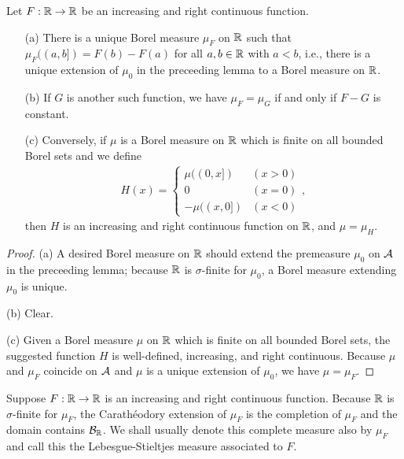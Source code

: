 \begin{thm}
    Let $F: {\mathbb{R}}\rightarrow{\mathbb{R}}$ be an increasing and right continuous function.
    \begin{enumerate}
        \item[(a)]
        {
            There is a unique Borel measure $\mu_F$ on ${\mathbb{R}}$ such that $\mu_F((a, b])=F(b)-F(a)$ for all $a, b\in{\mathbb{R}}$ with $a<b$, i.e., there is a unique extension of $\mu_0$ in the preceeding lemma to a Borel measure on ${\mathbb{R}}$.
        }
        \item[(b)]
        {
            If $G$ is another such function, we have $\mu_F=\mu_G$ if and only if $F-G$ is constant.
        }
        \item[(c)]
        {
            Conversely, if $\mu$ is a Borel measure on ${\mathbb{R}}$ which is finite on all bounded Borel sets and we define
            \begin{eqnarray*}
                H(x)=\left\{\begin{matrix}
                    \mu((0, x])     &   (x>0)\\
                        0           &   (x=0)\\
                    -\mu((x, 0])    &   (x<0)
                \end{matrix}\right.,
            \end{eqnarray*}
            then $H$ is an increasing and right continuous function on ${\mathbb{R}}$, and $\mu=\mu_H$.
        }
    \end{enumerate}
\end{thm}
\begin{proof}
    \hangindent=0.65cm
    \noindent(a)
    A desired Borel measure on ${\mathbb{R}}$ should extend the premeasure $\mu_0$ on ${\mathcal{A}}$ in the preceeding lemma; because ${\mathbb{R}}$ is $\sigma$-finite for $\mu_0$, a Borel measure extending $\mu_0$ is unique.

    \noindent(b)
    Clear.
    
    \noindent(c)
    Given a Borel measure $\mu$ on ${\mathbb{R}}$ which is finite on all bounded Borel sets, the suggested function $H$ is well-defined, increasing, and right continuous.
    Because $\mu$ and $\mu_F$ coincide on ${\mathcal{A}}$ and $\mu$ is a unique extension of $\mu_0$, we have $\mu=\mu_F$.
\end{proof}
\begin{rmk}
    Suppose $F: {\mathbb{R}}\rightarrow{\mathbb{R}}$ is an increasing and right continuous function.
    Because ${\mathbb{R}}$ is $\sigma$-finite for $\mu_F$, the Carath\'{e}odory extension of $\mu_F$ is the completion of $\mu_F$ and the domain contains ${\mathcal{B}}_{\mathbb{R}}$.
    We shall usually denote this complete measure also by $\mu_F$ and call this the Lebesgue-Stieltjes measure associated to $F$.
\end{rmk}

